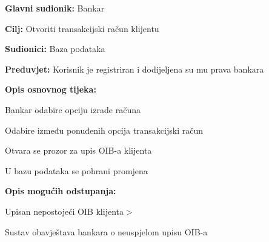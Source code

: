 \noindent {}
\begin{packed_item}

  \item \textbf{Glavni sudionik: }Bankar
  \item  \textbf{Cilj:} Otvoriti transakcijski račun klijentu
  \item  \textbf{Sudionici:} Baza podataka
  \item  \textbf{Preduvjet:} Korisnik je registriran i dodijeljena su mu prava bankara
  \item  \textbf{Opis osnovnog tijeka:}
  
  \item[] \begin{packed_enum}

    \item Bankar odabire opciju izrade računa 
    \item Odabire između ponuđenih opcija transakcijski račun
    \item Otvara se prozor za upis OIB-a klijenta 
    \item U bazu podataka se pohrani promjena 
  \end{packed_enum}
  
  \item  \textbf{Opis mogućih odstupanja:}
  
  \item[] \begin{packed_item}

    \item[3.a] Upisan nepostojeći OIB klijenta$>$
    \item[] \begin{packed_enum}
      
      \item Sustav obavještava bankara o neuspjelom upisu OIB-a 
      
    \end{packed_enum}
    
  \end{packed_item}
\end{packed_item}


